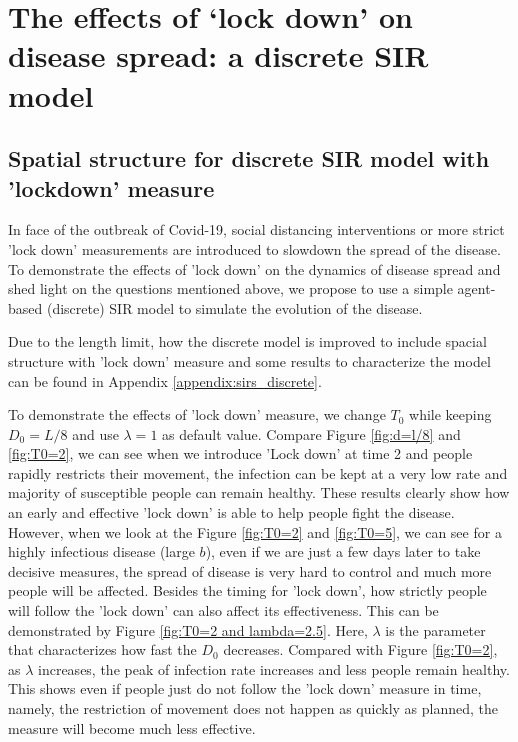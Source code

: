 \documentclass[12pt, reqno]{amsart}
\begin{document}
    \section{The effects of `lock down' on disease spread: a discrete SIR model}\label{section:lock_down}
    
    \subsection{Spatial structure for discrete SIR model with 'lockdown' measure}
    In face of the outbreak of Covid-19, social distancing interventions or more strict 'lock down' measurements are introduced to slowdown the spread of the disease. To demonstrate the effects of 'lock down' on the dynamics of disease spread and shed light on the questions mentioned above, we propose to use a simple agent-based (discrete) SIR model to simulate the evolution of the disease.
    
    Due to the length limit, how the discrete model is improved to include spacial structure with 'lock down' measure and some results to characterize the model can be found in Appendix \ref{appendix:sirs_discrete}.
    
    To demonstrate the effects of 'lock down' measure, we change $T_0$ while keeping $D_0 = L/8$ and use $\lambda = 1$ as default value. Compare Figure \ref{fig:d=l/8} and \ref{fig:T0=2}, we can see when we introduce 'Lock down' at time 2 and people rapidly restricts their movement, the infection can be kept at a very low rate and majority of susceptible people can remain healthy. These results clearly show how an early and effective 'lock down' is able to help people fight the disease. However, when we look at the Figure \ref{fig:T0=2} and \ref{fig:T0=5}, we can see for a highly infectious disease (large $b$), even if we are just a few days later to take decisive measures, the spread of disease is very hard to control and much more people will be affected. Besides the timing for 'lock down', how strictly people will follow the 'lock down' can also affect its effectiveness. This can be demonstrated by Figure \ref{fig:T0=2 and lambda=2.5}. Here, $\lambda$ is the parameter that characterizes how fast the $D_0$ decreases. Compared with Figure \ref{fig:T0=2}, as $\lambda$ increases, the peak of infection rate increases and less people remain healthy. This shows even if people just do not follow the 'lock down' measure in time, namely, the restriction of movement does not happen as quickly as planned, the measure will become much less effective. 
    
\end{document}
